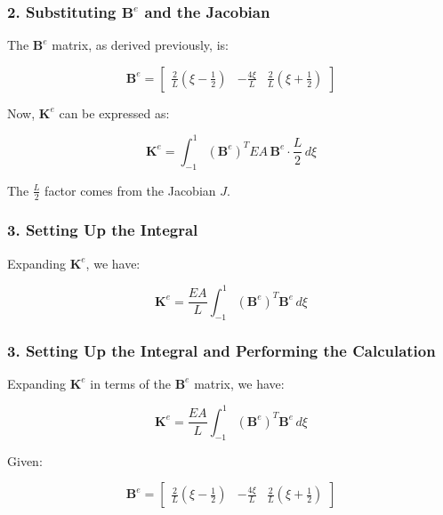 \documentclass{article}
\begin{document}
\subsubsection*{2. Substituting \( \mathbf{B}^e \) and the Jacobian}

The \( \mathbf{B}^e \) matrix, as derived previously, is:

\begin{equation}
    \mathbf{B}^e = \begin{bmatrix} \frac{2}{L} \left( \xi - \frac{1}{2} \right) & -\frac{4\xi}{L} & \frac{2}{L} \left( \xi + \frac{1}{2} \right) \end{bmatrix}
\end{equation}

Now, \( \mathbf{K}^e \) can be expressed as:

\begin{equation}
    \mathbf{K}^e = \int_{-1}^{1} (\mathbf{B}^e)^T E A \, \mathbf{B}^e \cdot \frac{L}{2} \, d\xi
\end{equation}

The \( \frac{L}{2} \) factor comes from the Jacobian \( J \).

\subsubsection*{3. Setting Up the Integral}

Expanding \( \mathbf{K}^e \), we have:

\begin{equation}
    \mathbf{K}^e = \frac{E A}{L} \int_{-1}^{1} (\mathbf{B}^e)^T \mathbf{B}^e \, d\xi
\end{equation}



\subsubsection*{3. Setting Up the Integral and Performing the Calculation}

Expanding \( \mathbf{K}^e \) in terms of the \( \mathbf{B}^e \) matrix, we have:

\[
    \mathbf{K}^e = \frac{E A}{L} \int_{-1}^{1} (\mathbf{B}^e)^T \mathbf{B}^e \, d\xi
\]

Given:

\[
    \mathbf{B}^e = \begin{bmatrix} \frac{2}{L} \left( \xi - \frac{1}{2} \right) & -\frac{4\xi}{L} & \frac{2}{L} \left( \xi + \frac{1}{2} \right) \end{bmatrix}
\]
\end{document}
